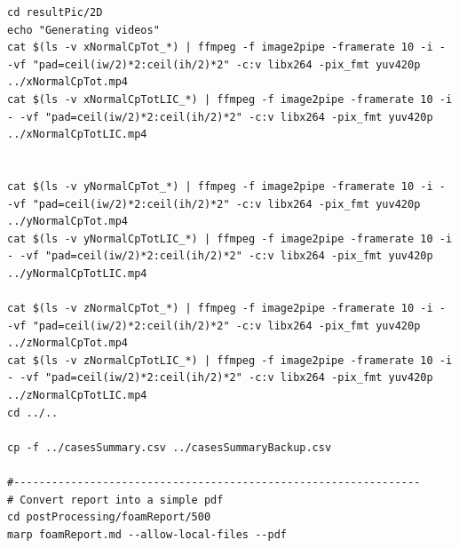 \documentclass[12pt,a4paper]{article}
\begin{document}
\begin{lstlisting}
cd resultPic/2D
echo "Generating videos"
cat $(ls -v xNormalCpTot_*) | ffmpeg -f image2pipe -framerate 10 -i - -vf "pad=ceil(iw/2)*2:ceil(ih/2)*2" -c:v libx264 -pix_fmt yuv420p ../xNormalCpTot.mp4
cat $(ls -v xNormalCpTotLIC_*) | ffmpeg -f image2pipe -framerate 10 -i - -vf "pad=ceil(iw/2)*2:ceil(ih/2)*2" -c:v libx264 -pix_fmt yuv420p ../xNormalCpTotLIC.mp4


cat $(ls -v yNormalCpTot_*) | ffmpeg -f image2pipe -framerate 10 -i - -vf "pad=ceil(iw/2)*2:ceil(ih/2)*2" -c:v libx264 -pix_fmt yuv420p ../yNormalCpTot.mp4
cat $(ls -v yNormalCpTotLIC_*) | ffmpeg -f image2pipe -framerate 10 -i - -vf "pad=ceil(iw/2)*2:ceil(ih/2)*2" -c:v libx264 -pix_fmt yuv420p ../yNormalCpTotLIC.mp4

cat $(ls -v zNormalCpTot_*) | ffmpeg -f image2pipe -framerate 10 -i - -vf "pad=ceil(iw/2)*2:ceil(ih/2)*2" -c:v libx264 -pix_fmt yuv420p ../zNormalCpTot.mp4
cat $(ls -v zNormalCpTotLIC_*) | ffmpeg -f image2pipe -framerate 10 -i - -vf "pad=ceil(iw/2)*2:ceil(ih/2)*2" -c:v libx264 -pix_fmt yuv420p ../zNormalCpTotLIC.mp4
cd ../..

cp -f ../casesSummary.csv ../casesSummaryBackup.csv

#----------------------------------------------------------------
# Convert report into a simple pdf
cd postProcessing/foamReport/500
marp foamReport.md --allow-local-files --pdf
\end{lstlisting}
\end{document}
